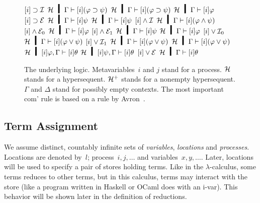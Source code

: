 \begin{figure}
\begin{center}
  {$[i]\supset\mathcal I$}
  {$\hyper\hmid\Gamma\vdash [i](\varphi\supset \psi)$}
  \hfill
  \BinaryRule
  {$\hyper\hmid\Gamma\vdash [i](\varphi\supset\psi)$}
  {$\hyper\hmid\Gamma\vdash [i]\varphi$}
  {$[i]\supset\mathcal E$}
  {$\hyper\hmid\Gamma\vdash [i]\psi$}
   \vskip 2mm
  \BinaryRule{$\hyper\hmid\Gamma\vdash [i]\varphi$}
   {$\hyper\hmid\Gamma\vdash [i]\psi$}
   {$[i]\wedge\mathcal I$}
   {$\hyper\hmid\Gamma\vdash [i](\varphi\wedge\psi)$}
   \vskip 2mm
  \UnaryRule{$\hyper\hmid\Gamma\vdash [i](\varphi\wedge\psi)$}
   {$[i]\wedge\mathcal E_0$}
   {$\hyper\hmid\Gamma\vdash[i]\varphi$}
   \hfill
  \UnaryRule{$\hyper\hmid\Gamma\vdash[i](\varphi\wedge\psi)$}
   {$[i]\wedge\mathcal E_1$}
   {$\hyper\hmid\Gamma\vdash[i]\psi$}
\vskip 2mm
  \UnaryRule
   {$\hyper\hmid\Gamma\vdash[i]\varphi$}
   {$[i]\vee\mathcal I_0$}
   {$\hyper\hmid\Gamma\vdash[i](\varphi\vee\psi)$}
   \hfill
  \UnaryRule{$\hyper\hmid\Gamma\vdash[i]\psi$}
   {$[i]\vee\mathcal I_1$}
   {$\hyper\hmid\Gamma\vdash[i](\varphi\vee\psi)$}
\vskip 2mm
   \TrinaryRule
   {$\hyper\hmid\Gamma\vdash[i](\varphi\vee\psi)$}
   {$\hyper\hmid[i]\varphi, \Gamma\vdash[i]\theta$}
   {$\hyper\hmid[i]\psi,    \Gamma\vdash[i]\theta$}
   {$[i]\vee\mathcal E$}
   {$\hyper\hmid         \Gamma\vdash[i]\theta$}
\vskip 2mm
\end{center}
\caption[The underlying logic .]
 {The underlying logic.
 Metavariables~$i$ and $j$ stand for a process.
 $\mathcal{H}$ stands for a
 hypersequent.
 $\mathcal{H}^+$ stands for a nonempty hypersequent.
 $\Gamma$ and $\Delta$ stand for possibly empty contexts.
 The most important com' rule is based on a rule by
 Avron~\cite{avron96}.
 }
\label{fig:logic}
\end{figure}

\subsection{Term Assignment}
\label{term}

We assume distinct, countably infinite sets of \textit{variables},
\textit{locations}
and
\textit{processes}.
Locations are denoted by~$l$; process~$i,j, \ldots$ and variables~$x,
y, \ldots$.
Later, locations will be used to specify a pair of stores
holding terms.  
Like in the $\lambda$-calculus, some terms reduces to other
terms, but in this calculus, terms may interact with the store (like
a program written in Haskell or OCaml does with an i-var).
This behavior will be shown later in the definition of reductions.

